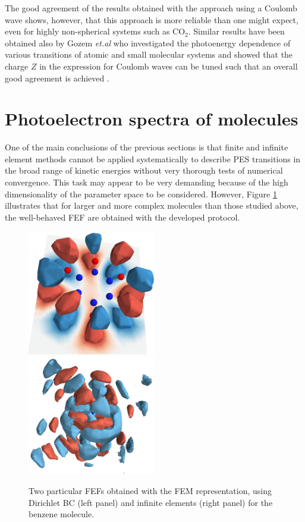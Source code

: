The good agreement of the results obtained with the approach using a Coulomb wave shows, however, that this approach is more reliable than one might expect, even for highly non-spherical systems such as CO$_2$.
Similar results have been obtained also by Gozem \textit{et.al} who investigated the photoenergy dependence of various transitions of atomic and small molecular systems and showed that the charge $Z$ in the expression for Coulomb waves can be tuned such that an overall good agreement is achieved \cite{do_modCoul}.

\section{Photoelectron spectra of molecules}
One of the main conclusions of the previous sections is that finite and infinite element methods cannot be applied systematically to describe PES transitions in the broad range of kinetic energies without very thorough tests of numerical convergence.
This task may appear to be very demanding because of the high dimensionality of the parameter space to be considered.
However, Figure \ref{eq:NiceFig} illustrates that for larger and more complex molecules than those studied above, the well-behaved FEF are obtained with the developed protocol.
\begin{figure}
   \includegraphics[width=0.5\textwidth]{Figures/Benzene/DBC_sol}
   \includegraphics[width=0.5\textwidth]{Figures/Benzene/inf_sol}
   \caption{Two particular FEFs obtained with the FEM representation, using Dirichlet BC (left panel) and infinite elements (right panel)
   for the benzene molecule.}
   \label{eq:NiceFig}
\end{figure}
